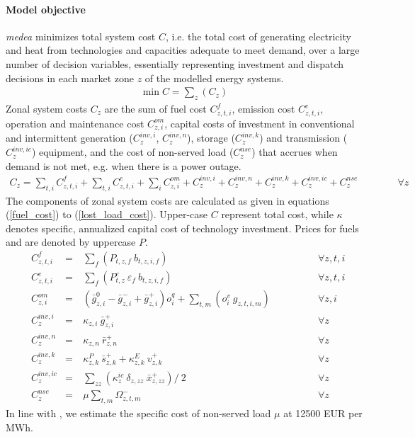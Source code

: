 \documentclass[11pt,a4paper]{article}
\begin{document}
\paragraph{Model objective}
\emph{medea} minimizes total system cost $C$, i.e. the total cost of generating electricity and heat from technologies and capacities adequate to meet demand, over a large number  of decision variables, essentially representing investment and dispatch decisions in each market zone $z$ of the modelled energy systems.
\begin{align}
\min C = \sum_{z} (C_{z})
\end{align}
Zonal system costs $C_{z}$ are the sum of fuel cost $C^{f}_{z,t,i}$, emission cost $C^{e}_{z,t,i}$, operation and maintenance cost $C^{om}_{z,i}$, capital costs of investment in conventional and intermittent generation ($C^{inv,i}_{z}$, $C^{inv,n}_{z}$), storage ($C^{inv,k}_{z}$) and transmission ($C^{inv,ic}_{z}$) equipment, and the cost of non-served load ($C^{nse}_{z}$) that accrues when demand is not met, e.g. when there is a power outage. 
\begin{align}
C_{z} = \sum_{t,i}  C^{f}_{z,t,i} + \sum_{t,i} C^{e}_{z,t,i} + \sum_{i} C^{om}_{z,i} + C^{inv,i}_{z} + 
 C^{inv,n}_{z} + C^{inv,k}_{z} + C^{inv,ic}_{z} + C^{nse}_{z} \qquad \qquad \forall z
\end{align}
The components of zonal system costs are calculated as given in equations (\ref{fuel_cost}) to (\ref{lost_load_cost}).
Upper-case $C$ represent total cost, while $\kappa$ denotes specific, annualized capital cost of technology investment. Prices for fuels and  are denoted by uppercase $P$.
\begin{align}
&C^{f}_{z,t,i}& =&\ \sum_{f} \left( P_{t,z,f} \: b_{t,z,i,f} \right) \qquad \qquad &\forall z,t,i \label{fuel_cost} \\
&C^{e}_{z,t,i}& =&\ \sum_{f} \left( P^{e}_{t,z} \: \varepsilon_{f} \: b_{t,z,i,f} \right) \qquad \qquad &\forall z,t,i\\
&C^{om}_{z,i}& =&\ \left(\bar{g}^{0}_{z,i} - \bar{g}^{-}_{z,i} + \bar{g}^{+}_{z,i}\right) o^{q}_{i} + \sum_{t,m} \left(o^{v}_{i} \: g_{z,t,i,m}\right) \qquad \qquad &\forall z,i \\
&C^{inv,i}_{z}& =&\ \kappa_{z,i} \: \bar{g}^{+}_{z,i} \qquad \qquad &\forall z\\
&C^{inv,n}_{z}& =&\ \kappa_{z,n} \: \bar{r}^{+}_{z,n} \qquad \qquad &\forall z\\
&C^{inv,k}_{z}& =&\ \kappa^{P}_{z,k} \: \bar{s}^{+}_{z,k} + \kappa^{E}_{z,k} \: v^{+}_{z,k} \qquad \qquad &\forall z\\
&C^{inv,ic}_{z}& =&\ \sum_{zz} (\kappa^{ic}_{z} \: \delta_{z,zz} \: \bar{x}^{+}_{z,zz}) / \: 2 \qquad \qquad &\forall z \label{transmission_expansion_cost}\\
&C^{nse}_{z}& =&\ \mu \sum_{t,m} \Omega^{-}_{z,t,m} \qquad \qquad &\forall z \label{lost_load_cost}
\end{align}
In line with \cite{citation}, we estimate the specific cost of non-served load $\mu$ at 12500 EUR per MWh.
\end{document}
